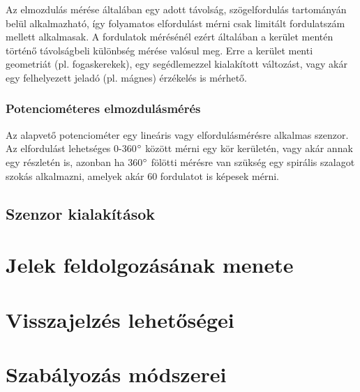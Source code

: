 Az elmozdulás mérése általában egy adott távolság, szögelfordulás tartományán belül alkalmazható, így folyamatos elfordulást mérni csak limitált fordulatszám mellett alkalmasak. A fordulatok mérésénél ezért általában a kerület mentén történő távolságbeli különbség mérése valósul meg. Erre a kerület menti geometriát (pl. fogaskerekek), egy segédlemezzel kialakított változást, vagy akár egy felhelyezett jeladó (pl. mágnes) érzékelés is mérhető.

\subsubsection{Potenciométeres elmozdulásmérés}

Az alapvető potenciométer egy lineáris vagy elfordulásmérésre alkalmas szenzor. Az elfordulást lehetséges 0-360$\degree$ között mérni egy kör kerületén, vagy akár annak egy részletén is, azonban ha 360$\degree$ fölötti mérésre van szükség egy spirális szalagot szokás alkalmazni, amelyek akár 60 fordulatot is képesek mérni. \cite{Morris2016} 

\subsection{Szenzor kialakítások}

\section{Jelek feldolgozásának menete}

\section{Visszajelzés lehetőségei}

\section{Szabályozás módszerei}
